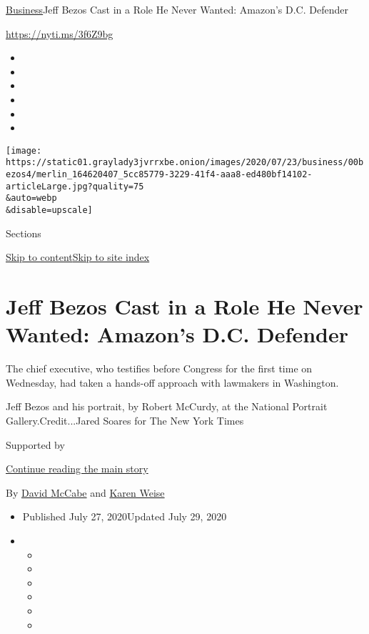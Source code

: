 \href{/section/business}{Business}\textbar{}Jeff Bezos Cast in a Role He
Never Wanted: Amazon's D.C. Defender

\href{https://nyti.ms/3f6Z9bg}{https://nyti.ms/3f6Z9bg}

\begin{itemize}
\item
\item
\item
\item
\item
\item
\end{itemize}

\texttt{[image: https://static01.graylady3jvrrxbe.onion/images/2020/07/23/business/00bezos4/merlin\_164620407\_5cc85779-3229-41f4-aaa8-ed480bf14102-articleLarge.jpg?quality=75\\\&auto=webp\\\&disable=upscale]}

Sections

\protect\hyperlink{site-content}{Skip to
content}\protect\hyperlink{site-index}{Skip to site index}

\hypertarget{jeff-bezos-cast-in-a-role-he-never-wanted-amazons-dc-defender}{%
\section{Jeff Bezos Cast in a Role He Never Wanted: Amazon's D.C.
Defender}\label{jeff-bezos-cast-in-a-role-he-never-wanted-amazons-dc-defender}}

The chief executive, who testifies before Congress for the first time on
Wednesday, had taken a hands-off approach with lawmakers in Washington.

Jeff Bezos and his portrait, by Robert McCurdy, at the National Portrait
Gallery.Credit...Jared Soares for The New York Times

Supported by

\protect\hyperlink{after-sponsor}{Continue reading the main story}

By \href{https://www.nytimes3xbfgragh.onion/by/david-mccabe}{David
McCabe} and
\href{https://www.nytimes3xbfgragh.onion/by/karen-weise}{Karen Weise}

\begin{itemize}
\item
  Published July 27, 2020Updated July 29, 2020
\item
  \begin{itemize}
  \item
  \item
  \item
  \item
  \item
  \item
  \end{itemize}
\end{itemize}


